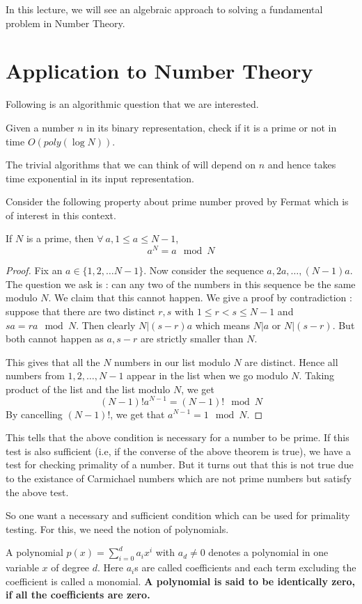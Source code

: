 In this lecture, we will see an algebraic approach to solving a fundamental
problem in Number Theory.
\section{Application to Number Theory}
Following is an algorithmic question that we are interested.
\begin{problem}
Given a number $n$ in its binary representation, check if it is a prime or not
in time $O(poly(\log N))$.
\end{problem}
\begin{note}
The trivial algorithms that we can think of will depend on $n$ and hence takes
time exponential in its input representation.
\end{note}

Consider the following property about prime number proved by Fermat which is
of interest in this context.
\begin{theorem} If $N$ is a prime, then $\forall~a, 1
	\le a \le N-1$, \[ a^N = a \mod N \]
\end{theorem}
\begin{proof}
	Fix an $a \in \{1,2,\ldots N-1\}$. Now consider the sequence $a, 2a,
	\ldots, (N-1)a$. The question we ask is : can any two of the numbers
	in this sequence be the same modulo $N$. We claim that this cannot
	happen. We give a proof by contradiction : suppose that there are two
	distinct $r,s$ with $1 \le r < s \le N-1$ and $sa = ra \mod N$. Then
	clearly $N | (s-r)a$ which means $N | a$ or $N | (s-r)$. But both
	cannot happen as $a, s-r$ are strictly smaller than $N$.

	This gives that all the $N$ numbers in our list modulo $N$ are
	distinct. Hence all numbers from $1,2,\ldots, N-1$ appear in the list
	when we go modulo $N$. Taking product of the list and the list modulo
	$N$, we get 
	\[ (N-1)! a^{N-1} = (N-1)! \mod N \]
	By cancelling $(N-1)!$, we get that $a^{N-1} = 1 \mod N$.
\end{proof}
This tells that the above condition is necessary for a number to be prime. If
this test is also sufficient (i.e, if the converse of the above theorem is
true), we have a test for checking primality of a number. But it turns out
that this is not true due to the existance of Carmichael numbers which are not
prime numbers but satisfy the above test.

So one want a necessary and sufficient condition which can be used for
primality testing. For this, we need the notion of polynomials.
\begin{definition}
	A polynomial $p(x) = \sum_{i=0}^d a_ix^i$ with $a_d \ne 0$ denotes a
	polynomial in one variable $x$ of degree $d$. Here $a_i$s are called
	coefficients and each term excluding the coefficient is called a
	monomial. \textbf{A polynomial is said to be identically zero, if all the
	coefficients are zero.}
\end{definition}

